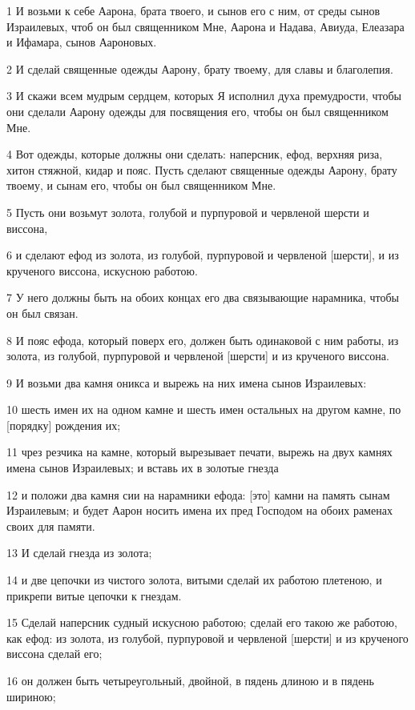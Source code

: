 \par 1 И возьми к себе Аарона, брата твоего, и сынов его с ним, от среды сынов Израилевых, чтоб он был священником Мне, Аарона и Надава, Авиуда, Елеазара и Ифамара, сынов Аароновых.
\par 2 И сделай священные одежды Аарону, брату твоему, для славы и благолепия.
\par 3 И скажи всем мудрым сердцем, которых Я исполнил духа премудрости, чтобы они сделали Аарону одежды для посвящения его, чтобы он был священником Мне.
\par 4 Вот одежды, которые должны они сделать: наперсник, ефод, верхняя риза, хитон стяжной, кидар и пояс. Пусть сделают священные одежды Аарону, брату твоему, и сынам его, чтобы он был священником Мне.
\par 5 Пусть они возьмут золота, голубой и пурпуровой и червленой шерсти и виссона,
\par 6 и сделают ефод из золота, из голубой, пурпуровой и червленой [шерсти], и из крученого виссона, искусною работою.
\par 7 У него должны быть на обоих концах его два связывающие нарамника, чтобы он был связан.
\par 8 И пояс ефода, который поверх его, должен быть одинаковой с ним работы, из золота, из голубой, пурпуровой и червленой [шерсти] и из крученого виссона.
\par 9 И возьми два камня оникса и вырежь на них имена сынов Израилевых:
\par 10 шесть имен их на одном камне и шесть имен остальных на другом камне, по [порядку] рождения их;
\par 11 чрез резчика на камне, который вырезывает печати, вырежь на двух камнях имена сынов Израилевых; и вставь их в золотые гнезда
\par 12 и положи два камня сии на нарамники ефода: [это] камни на память сынам Израилевым; и будет Аарон носить имена их пред Господом на обоих раменах своих для памяти.
\par 13 И сделай гнезда из золота;
\par 14 и две цепочки из чистого золота, витыми сделай их работою плетеною, и прикрепи витые цепочки к гнездам.
\par 15 Сделай наперсник судный искусною работою; сделай его такою же работою, как ефод: из золота, из голубой, пурпуровой и червленой [шерсти] и из крученого виссона сделай его;
\par 16 он должен быть четыреугольный, двойной, в пядень длиною и в пядень шириною;
